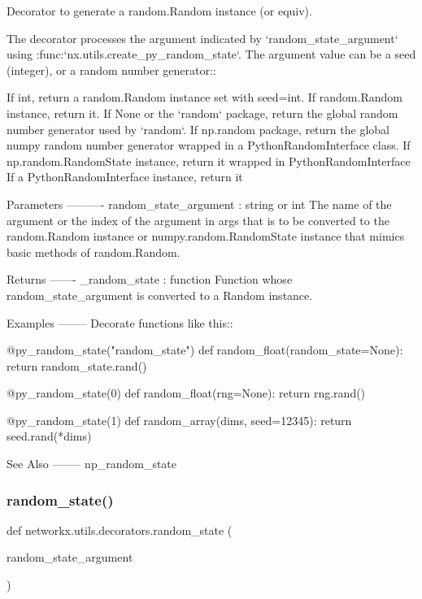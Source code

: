 \begin{DoxyVerb}Decorator to generate a random.Random instance (or equiv).

The decorator processes the argument indicated by `random_state_argument`
using :func:`nx.utils.create_py_random_state`.
The argument value can be a seed (integer), or a random number generator::

    If int, return a random.Random instance set with seed=int.
    If random.Random instance, return it.
    If None or the `random` package, return the global random number
    generator used by `random`.
    If np.random package, return the global numpy random number
    generator wrapped in a PythonRandomInterface class.
    If np.random.RandomState instance, return it wrapped in
    PythonRandomInterface
    If a PythonRandomInterface instance, return it

Parameters
----------
random_state_argument : string or int
    The name of the argument or the index of the argument in args that is
    to be converted to the random.Random instance or numpy.random.RandomState
    instance that mimics basic methods of random.Random.

Returns
-------
_random_state : function
    Function whose random_state_argument is converted to a Random instance.

Examples
--------
Decorate functions like this::

   @py_random_state("random_state")
   def random_float(random_state=None):
       return random_state.rand()

   @py_random_state(0)
   def random_float(rng=None):
       return rng.rand()

   @py_random_state(1)
   def random_array(dims, seed=12345):
       return seed.rand(*dims)

See Also
--------
np_random_state
\end{DoxyVerb}
 \mbox{\label{namespacenetworkx_1_1utils_1_1decorators_aac9c86a445c407bb96ac3a7103a62a07}} 
\subsubsection{\texorpdfstring{random\+\_\+state()}{random\_state()}}
{\footnotesize\ttfamily def networkx.\+utils.\+decorators.\+random\+\_\+state (\begin{DoxyParamCaption}\item[{}]{random\+\_\+state\+\_\+argument }\end{DoxyParamCaption})}

